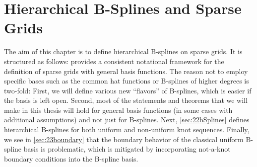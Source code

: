 
\chapter{Hierarchical B-Splines and Sparse Grids}
\label{sec:20sparseGrids}


The aim of this chapter is to define hierarchical B-splines on sparse grids.
It is structured as follows:
 provides a consistent notational framework
for the definition of sparse grids with general basis functions.
The reason not to employ specific bases such as the common hat functions
or B-splines of higher degrees is two-fold:
First, we will define various new ``flavors'' of B-splines,
which is easier if the basis is left open.
Second, most of the statements and theorems that we will make in this
thesis will hold for general basis functions
(in some cases with additional assumptions)
and not just for B-splines.
Next, \cref{sec:22bSplines} defines hierarchical B-splines for both
uniform and non-uniform knot sequences.
Finally, we see in \cref{sec:23boundary} that the boundary behavior
of the classical uniform B-spline basis is problematic,
which is mitigated by incorporating not-a-knot boundary conditions
into the B-spline basis.




